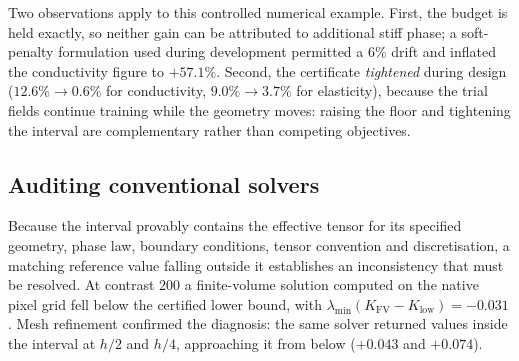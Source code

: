 \begin{table}[t]
\centering
\caption{Illustrative certified design on controlled synthetic periodic
cells at exactly fixed material budget. The reported gain is in the
\emph{guaranteed} value for that specified model, certified by exact
integration.}
\label{tab:design}
\end{table}

Two observations apply to this controlled numerical example. First, the
budget is held exactly, so neither gain can be attributed to additional stiff phase; a soft-penalty formulation used
during development permitted a $6\%$ drift and inflated the conductivity
figure to $+57.1\%$. Second, the certificate \emph{tightened} during design
($12.6\% \to 0.6\%$ for conductivity, $9.0\% \to 3.7\%$ for elasticity),
because the trial fields continue training while the geometry moves:
raising the floor and tightening the interval are complementary rather than
competing objectives.

\subsection{Auditing conventional solvers}
\label{sec:applications:audit}

Because the interval provably contains the effective tensor for its specified
geometry, phase law, boundary conditions, tensor convention and
discretisation, a matching reference value falling outside it establishes an
inconsistency that must be resolved. At contrast
$200$ a finite-volume solution computed on the native pixel grid fell below
the certified lower bound, with
$\lambda_{\min}(K_{\mathrm{FV}} - K_{\mathrm{low}}) = -0.031$. Mesh
refinement confirmed the diagnosis: the same solver returned values inside
the interval at $h/2$ and $h/4$, approaching it from below
($+0.043$ and $+0.074$).

